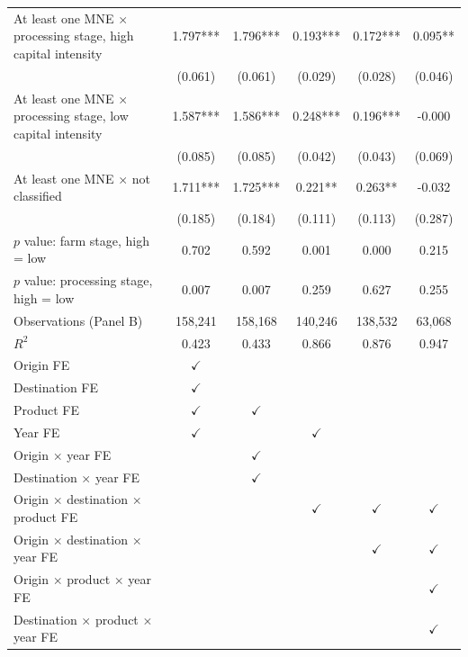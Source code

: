 \begin{tabular}{l*{5}{c}}
At least one MNE $\times$ processing stage, high capital intensity & 1.797*** & 1.796*** & 0.193*** & 0.172*** & 0.095** \\
 & (0.061) & (0.061) & (0.029) & (0.028) & (0.046) \\
At least one MNE $\times$ processing stage, low capital intensity & 1.587*** & 1.586*** & 0.248*** & 0.196*** & -0.000 \\
 & (0.085) & (0.085) & (0.042) & (0.043) & (0.069) \\
At least one MNE $\times$ not classified & 1.711*** & 1.725*** & 0.221** & 0.263** & -0.032 \\
 & (0.185) & (0.184) & (0.111) & (0.113) & (0.287) \\
$p$ value: farm stage, high = low & 0.702 & 0.592 & 0.001 & 0.000 & 0.215 \\
$p$ value: processing stage, high = low & 0.007 & 0.007 & 0.259 & 0.627 & 0.255 \\
Observations (Panel B) & 158,241 & 158,168 & 140,246 & 138,532 & 63,068 \\
$R^2$ & 0.423 & 0.433 & 0.866 & 0.876 & 0.947 \\
\midrule
Origin FE & $\checkmark$ &  &  &  &  \\
Destination FE & $\checkmark$ &  &  &  &  \\
Product FE & $\checkmark$ & $\checkmark$ &  &  &  \\
Year FE & $\checkmark$ &  & $\checkmark$ &  &  \\
Origin $\times$ year FE &  & $\checkmark$ &  &  &  \\
Destination $\times$ year FE &  & $\checkmark$ &  &  &  \\
Origin $\times$ destination $\times$ product FE &  &  & $\checkmark$ & $\checkmark$ & $\checkmark$ \\
Origin $\times$ destination $\times$ year FE &  &  &  & $\checkmark$ & $\checkmark$ \\
Origin $\times$ product $\times$ year FE &  &  &  &  & $\checkmark$ \\
Destination $\times$ product $\times$ year FE &  &  &  &  & $\checkmark$ \\
\bottomrule
\end{tabular}
